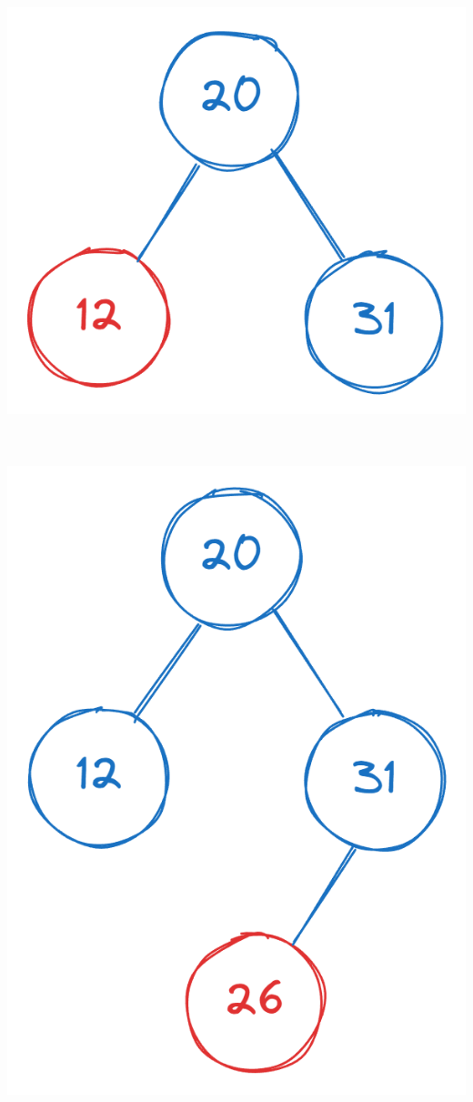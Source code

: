 \begin{minipage}[t]{.24\textwidth}
    \vspace{0pt}
     \\
    \centering
    \includegraphics[width=0.88\linewidth]{HWs//HW7//figures/3_3.png}
\end{minipage}
\hspace{10pt}
\begin{minipage}[t]{.24\textwidth}
    \vspace{0pt}
     \\ \\
    \centering
    \includegraphics[width=0.88\linewidth]{HWs//HW7//figures/3_4.png}
\end{minipage}
